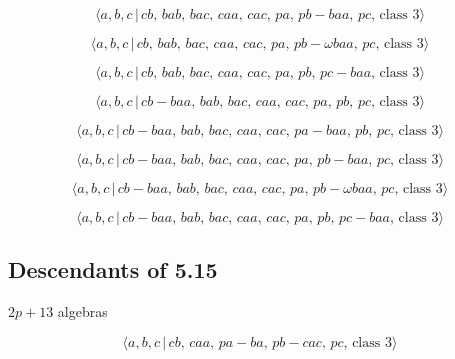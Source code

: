 \documentclass[10pt]{article}
\begin{document}
\begin{equation}
\langle a,b,c\,|\,cb,\,bab,\,bac,\,caa,\,cac,\,pa,\,pb-baa,\,pc,\,\text{
class }3\rangle  \tag{6.258}
\end{equation}

\begin{equation}
\langle a,b,c\,|\,cb,\,bab,\,bac,\,caa,\,cac,\,pa,\,pb-\omega baa,\,pc,\,%
\text{class }3\rangle  \tag{6.259}
\end{equation}

\begin{equation}
\langle a,b,c\,|\,cb,\,bab,\,bac,\,caa,\,cac,\,pa,\,pb,\,pc-baa,\,\text{
class }3\rangle  \tag{6.260}
\end{equation}

\begin{equation}
\langle a,b,c\,|\,cb-baa,\,bab,\,bac,\,caa,\,cac,\,pa,\,pb,\,pc,\,\text{
class }3\rangle  \tag{6.261}
\end{equation}

\begin{equation}
\langle a,b,c\,|\,cb-baa,\,bab,\,bac,\,caa,\,cac,\,pa-baa,\,pb,\,pc,\,\text{
class }3\rangle  \tag{6.262}
\end{equation}

\begin{equation}
\langle a,b,c\,|\,cb-baa,\,bab,\,bac,\,caa,\,cac,\,pa,\,pb-baa,\,pc,\,\text{
class }3\rangle  \tag{6.263}
\end{equation}

\begin{equation}
\langle a,b,c\,|\,cb-baa,\,bab,\,bac,\,caa,\,cac,\,pa,\,pb-\omega baa,\,pc,\,%
\text{class }3\rangle  \tag{6.264}
\end{equation}

\begin{equation}
\langle a,b,c\,|\,cb-baa,\,bab,\,bac,\,caa,\,cac,\,pa,\,pb,\,pc-baa,\,\text{
class }3\rangle  \tag{6.265}
\end{equation}

\subsection{Descendants of 5.15}

$2p+13$ algebras

\begin{equation}
\langle a,b,c\,|\,cb,\,caa,\,pa-ba,\,pb-cac,\,pc,\,\text{class }3\rangle 
\tag{6.266}
\end{equation}
\end{document}
